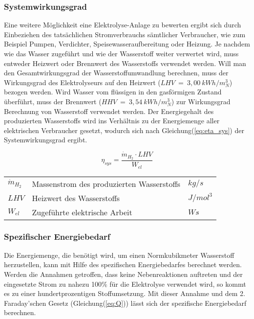 \documentclass[onecolumn,10pt,titlepage]{article}
\begin{document}
		\subsubsection*{Systemwirkungsgrad}
		Eine weitere Möglichkeit eine Elektrolyse-Anlage zu bewerten ergibt sich durch Einbeziehen des tatsächlichen Stromverbrauchs sämtlicher Verbraucher, wie zum Beispiel Pumpen, Verdichter, Speisewasseraufbereitung oder Heizung. Je nachdem wie das Wasser zugeführt und wie der Wasserstoff weiter verwertet wird, muss entweder Heizwert oder Brennwert des Wasserstoffs verwendet werden.\cite{Smolinka.05.07.2011} Will man den Gesamtwirkungsgrad der Wasserstoffumwandlung berechnen, muss der Wirkungsgrad des Elektrolyseurs auf den Heizwert ($LHV~=~3,00 ~kWh/m^3_N$) bezogen werden. Wird Wasser vom flüssigen in den gasförmigen Zustand überführt, muss der Brennwert ($HHV~=~3,54~ kWh/m^3_N$) zur Wirkungsgrad Berechnung von Wasserstoff verwendet werden. Der Energiegehalt des produzierten Wasserstoffs wird ins Verhältnis zu der Energiemenge aller elektrischen Verbraucher gesetzt, wodurch sich nach Gleichung(\ref{eq:eta_sys}) der Systemwirkungsgrad ergibt.\cite{Bayer.2000}

		\begin{equation}
		\label{eq:eta_sys}
		\eta_{sys}=\frac{\dot{m}_{H_2}\cdot LHV}{W_{el}}
		\end{equation}

		\begin{table}[H]
			\begin{tabular*}{\textwidth}{lll}
				$\dot{m}_{H_2}$&Massenstrom des produzierten Wasserstoffs&$kg/s$\\
				$LHV$&Heizwert des Wasserstoffs&$J/mol^3$\\
				$W_{el}$&Zugeführte elektrische Arbeit&$Ws$\\
			\end{tabular*}
		\end{table}
		\subsubsection*{Spezifischer Energiebedarf}
		Die Energiemenge, die benötigt wird, um einen Normkubikmeter Wasserstoff herzustellen, kann mit Hilfe des spezifischen Energiebedarfes berechnet werden.\cite{Hey.26.Oktober2012} Werden die Annahmen getroffen, dass keine Nebenreaktionen auftreten und der eingesetzte Strom zu nahezu 100\% für die Elektrolyse verwendet wird, so kommt es zu einer hundertprozentigen Stoffumsetzung. Mit dieser Annahme und dem 2. Faraday’schen Gesetz (Gleichung(\ref{eq:Q})) lässt sich der spezifische Energiebedarf berechnen.
\end{document}

